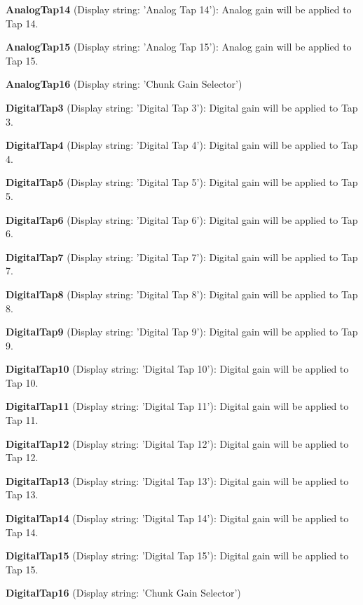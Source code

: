 \begin{DoxyItemize}
\item {\bfseries Analog\+Tap14} (Display string\+: 'Analog Tap 14')\+: Analog gain will be applied to Tap 14.
\item {\bfseries Analog\+Tap15} (Display string\+: 'Analog Tap 15')\+: Analog gain will be applied to Tap 15.
\item {\bfseries Analog\+Tap16} (Display string\+: 'Chunk Gain Selector')
\item {\bfseries Digital\+Tap3} (Display string\+: 'Digital Tap 3')\+: Digital gain will be applied to Tap 3.
\item {\bfseries Digital\+Tap4} (Display string\+: 'Digital Tap 4')\+: Digital gain will be applied to Tap 4.
\item {\bfseries Digital\+Tap5} (Display string\+: 'Digital Tap 5')\+: Digital gain will be applied to Tap 5.
\item {\bfseries Digital\+Tap6} (Display string\+: 'Digital Tap 6')\+: Digital gain will be applied to Tap 6.
\item {\bfseries Digital\+Tap7} (Display string\+: 'Digital Tap 7')\+: Digital gain will be applied to Tap 7.
\item {\bfseries Digital\+Tap8} (Display string\+: 'Digital Tap 8')\+: Digital gain will be applied to Tap 8.
\item {\bfseries Digital\+Tap9} (Display string\+: 'Digital Tap 9')\+: Digital gain will be applied to Tap 9.
\item {\bfseries Digital\+Tap10} (Display string\+: 'Digital Tap 10')\+: Digital gain will be applied to Tap 10.
\item {\bfseries Digital\+Tap11} (Display string\+: 'Digital Tap 11')\+: Digital gain will be applied to Tap 11.
\item {\bfseries Digital\+Tap12} (Display string\+: 'Digital Tap 12')\+: Digital gain will be applied to Tap 12.
\item {\bfseries Digital\+Tap13} (Display string\+: 'Digital Tap 13')\+: Digital gain will be applied to Tap 13.
\item {\bfseries Digital\+Tap14} (Display string\+: 'Digital Tap 14')\+: Digital gain will be applied to Tap 14.
\item {\bfseries Digital\+Tap15} (Display string\+: 'Digital Tap 15')\+: Digital gain will be applied to Tap 15.
\item {\bfseries Digital\+Tap16} (Display string\+: 'Chunk Gain Selector')
\end{DoxyItemize}

